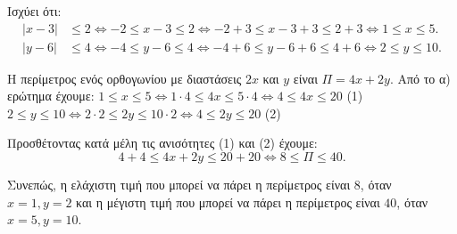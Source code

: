 
\begin{alist}
\item Ισχύει ότι:
\begin{align*}
|x - 3| &\le 2 \Leftrightarrow -2 \le x - 3 \le 2 \Leftrightarrow -2 + 3 \le x - 3 + 3 \le 2 + 3 \Leftrightarrow 1 \le x \le 5. \\
|y - 6| &\le 4 \Leftrightarrow -4 \le y - 6 \le 4 \Leftrightarrow -4 + 6 \le y - 6 + 6 \le 4 + 6 \Leftrightarrow 2 \le y \le 10.
\end{align*}

\item Η περίμετρος ενός ορθογωνίου με διαστάσεις $2x$ και $y$ είναι $\Pi = 4x + 2y$.
Από το α) ερώτημα έχουμε:
$1 \le x \le 5 \Leftrightarrow 1 \cdot 4 \le 4x \le 5 \cdot 4 \Leftrightarrow 4 \le 4x \le 20$ (1)
$2 \le y \le 10 \Leftrightarrow 2 \cdot 2 \le 2y \le 10 \cdot 2 \Leftrightarrow 4 \le 2y \le 20$ (2)

Προσθέτοντας κατά μέλη τις ανισότητες (1) και (2) έχουμε:
\[4 + 4 \le 4x + 2y \le 20 + 20 \Leftrightarrow 8 \le \Pi \le 40.\]

Συνεπώς, η ελάχιστη τιμή που μπορεί να πάρει η περίμετρος είναι $8$, όταν $x = 1, y = 2$ και η μέγιστη τιμή που μπορεί να πάρει η περίμετρος είναι $40$, όταν $x = 5, y = 10$.
\end{alist}

